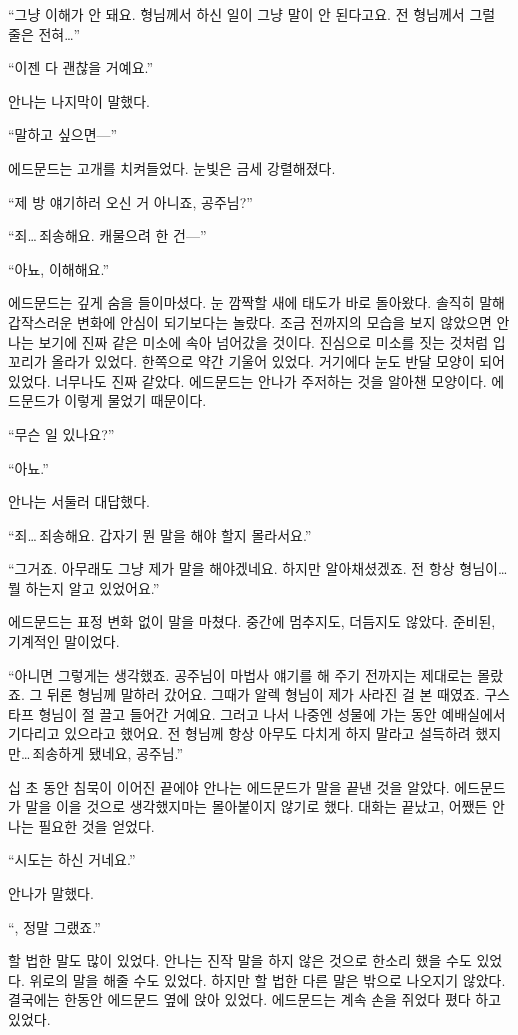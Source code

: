 ``그냥 이해가 안 돼요. 형님께서 하신 일이 그냥 말이 안 된다고요. 전 형님께서 그럴 줄은 전혀\ldots''

``이젠 다 괜찮을 거예요.''

안나는 나지막이 말했다.

``말하고 싶으면—''

에드문드는 고개를 치켜들었다. 눈빛은 금세 강렬해졌다.

``제 방 얘기하러 오신 거 아니죠, 공주님?''

``죄\ldots\,죄송해요. 캐물으려 한 건—''

``아뇨, 이해해요.''

에드문드는 깊게 숨을 들이마셨다. 눈 깜짝할 새에 태도가 바로 돌아왔다. 솔직히 말해 갑작스러운 변화에 안심이 되기보다는 놀랐다. 조금 전까지의 모습을 보지 않았으면 안나는 보기에 진짜 같은 미소에 속아 넘어갔을 것이다. 진심으로 미소를 짓는 것처럼 입꼬리가 올라가 있었다. 한쪽으로 약간 기울어 있었다. 거기에다 눈도 반달 모양이 되어 있었다. 너무나도 진짜 같았다. 에드문드는 안나가 주저하는 것을 알아챈 모양이다. 에드문드가 이렇게 물었기 때문이다.

``무슨 일 있나요?''

``아뇨.''

안나는 서둘러 대답했다.

``죄\ldots\,죄송해요. 갑자기 뭔 말을 해야 할지 몰라서요.''

``그거죠. 아무래도 그냥 제가 말을 해야겠네요. 하지만 알아채셨겠죠. 전 항상 형님이\ldots\,뭘 하는지 알고 있었어요.''

에드문드는 표정 변화 없이 말을 마쳤다. 중간에 멈추지도, 더듬지도 않았다. 준비된, 기계적인 말이었다.

``아니면 그렇게는 생각했죠. 공주님이 마법사 얘기를 해 주기 전까지는 제대로는 몰랐죠. 그 뒤론 형님께 말하러 갔어요. 그때가 알렉 형님이 제가 사라진 걸 본 때였죠. 구스타프 형님이 절 끌고 들어간 거예요. 그러고 나서 나중엔 성물에 가는 동안 예배실에서 기다리고 있으라고 했어요. 전 형님께 항상 아무도 다치게 하지 말라고 설득하려 했지만\ldots\,죄송하게 됐네요, 공주님.''

십 초 동안 침묵이 이어진 끝에야 안나는 에드문드가 말을 끝낸 것을 알았다. 에드문드가 말을 이을 것으로 생각했지마는 몰아붙이지 않기로 했다. 대화는 끝났고, 어쨌든 안나는 필요한 것을 얻었다.

``시도는 하신 거네요.''

안나가 말했다.

``, 정말 그랬죠.''

할 법한 말도 많이 있었다. 안나는 진작 말을 하지 않은 것으로 한소리 했을 수도 있었다. 위로의 말을 해줄 수도 있었다. 하지만 할 법한 다른 말은 밖으로 나오지기 않았다. 결국에는 한동안 에드문드 옆에 앉아 있었다. 에드문드는 계속 손을 쥐었다 폈다 하고 있었다.

